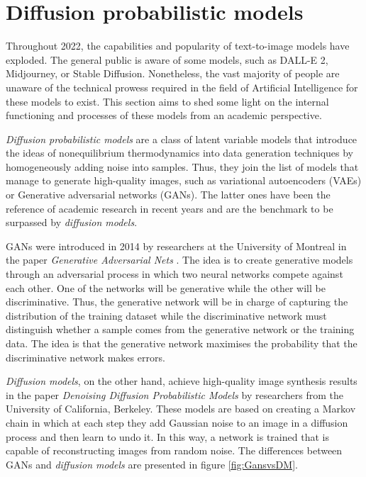 \section{Diffusion probabilistic models} \label{Dprobabilistic}

Throughout 2022, the capabilities and popularity of text-to-image models have exploded. The general public is aware of some models, such as DALL-E 2, Midjourney, or Stable Diffusion. Nonetheless, the vast majority of people are unaware of the technical prowess required in the field of Artificial Intelligence for these models to exist. This section aims to shed some light on the internal functioning and processes of these models from an academic perspective.

\textit{Diffusion probabilistic models} are a class of latent variable models that introduce the ideas of nonequilibrium thermodynamics into data generation techniques by homogeneously adding noise into samples. Thus, they join the list of models that manage to generate high-quality images, such as variational autoencoders (VAEs) or Generative adversarial networks (GANs). The latter ones have been the reference of academic research in recent years and are the benchmark to be surpassed by \textit{diffusion models}. 

GANs were introduced in 2014 by researchers at the University of Montreal in the paper \textit{Generative Adversarial Nets} \cite{goodfellow2020generative}. The idea is to create generative models through an adversarial process in which two neural networks compete against each other.  One of the networks will be generative while the other will be discriminative. Thus, the generative network will be in charge of capturing the distribution of the training dataset while the discriminative network must distinguish whether a sample comes from the generative network or the training data. The idea is that the generative network maximises the probability that the discriminative network makes errors. 

\textit{Diffusion models}, on the other hand, achieve high-quality image synthesis results in the paper \textit{Denoising Diffusion Probabilistic Models} \cite{ho2020denoising} by researchers from the University of California, Berkeley. These models are based on creating a Markov chain in which at each step they add Gaussian noise to an image in a diffusion process and then learn to undo it. In this way, a network is trained that is capable of reconstructing images from random noise. The differences between GANs and \textit{diffusion models} are presented in figure \ref{fig:GansvsDM}.

